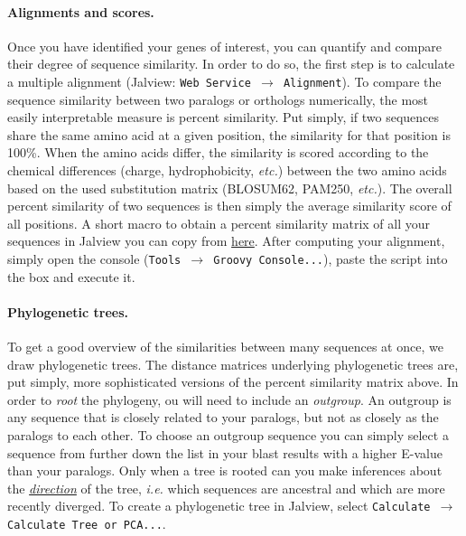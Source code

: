 \documentclass[11pt]{article}
\begin{document}
	\paragraph*{Alignments and scores.} Once you have identified your genes of interest, you can quantify and compare their degree of sequence similarity.
	In order to do so, the first step is to calculate a multiple alignment (Jalview: \texttt{Web Service $\rightarrow$ Alignment}).
	To compare the sequence similarity between two paralogs or orthologs numerically, the most easily interpretable measure is percent similarity. 
	Put simply, if two sequences share the same amino acid at a given position, the similarity for that position is 100\%. 
	When the amino acids differ, the similarity is scored according to the chemical differences (charge, hydrophobicity, \textit{etc.}) between the two amino acids based on the used substitution matrix (BLOSUM62, PAM250, \textit{etc.}). 
	The overall percent similarity of two sequences is then simply the average similarity score of all positions. 
	A short macro to obtain a percent similarity matrix of all your sequences in Jalview you can copy from \href{https://github.com/leonardblaschek/teaching/blob/master/bioinformatics/jalview_simmat.txt}{here}. 
	After computing your alignment, simply open the console (\texttt{Tools $\rightarrow$ Groovy Console...}), paste the script into the box and execute it.
	
	\paragraph*{Phylogenetic trees.}To get a good overview of the similarities between many sequences at once, we draw phylogenetic trees. The distance matrices underlying phylogenetic trees are, put simply, more sophisticated versions of the percent similarity matrix above. In order to \textit{root} the phylogeny, ou will need to include an \textit{outgroup}. An outgroup is any sequence that is closely related to your paralogs, but not as closely as the paralogs to each other. To choose an outgroup sequence you can simply select a sequence from further down the list in your blast results with a higher E-value than your paralogs. Only when a tree is rooted can you make inferences about the \href{https://evolution.berkeley.edu/evolibrary/article/evo_05}{\textit{direction}} of the tree, \textit{i.e.} which sequences are ancestral and which are more recently diverged. To create a phylogenetic tree in Jalview, select \texttt{Calculate $\rightarrow$ Calculate Tree or PCA...}.
	
\end{document}
